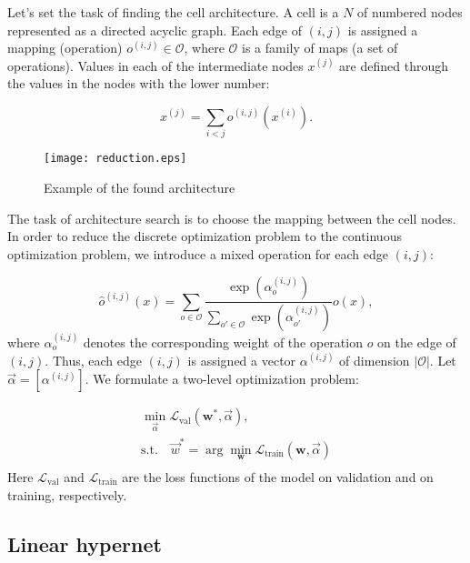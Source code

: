 \documentclass[runningheads]{llncs}
\begin{document}
Let's set the task of finding the cell architecture.
A cell is a $N$ of numbered nodes represented as a directed acyclic graph. Each edge of $(i, j)$ is assigned a mapping (operation) $o^{(i, j)} \in \mathcal{O}$, where $\mathcal{O}$ is a family of maps (a set of operations). Values in each of the intermediate nodes $x^{(j)}$ are defined through the values in the nodes with the lower number:

 \begin{equation}
 x^{(j)} = \sum_{i < j}o^{(i, j)}(x^{(i)}).
 \end{equation}
 
 \begin{figure}
 \centering
 \texttt{[image: reduction.eps]}
 \caption{Example of the found architecture}
 \end{figure}

The task of architecture search is to choose the mapping between the cell nodes. In order to reduce the discrete optimization problem to the continuous optimization problem, we introduce a mixed operation for each edge $(i, j)$:

\begin{equation}
\hat{o}^{(i, j)}(x) = \sum_{o\in \mathcal{O}} \frac{\exp(\alpha_o^{(i, j)})}{\sum_{o'\in\mathcal{O}} \exp(\alpha_{o'}^{(i, j)})}o(x),
\end{equation}
where $\alpha_o^{(i, j)}$ denotes the corresponding weight of the operation $o$ on the edge of $(i, j)$. Thus, each edge $(i, j)$ is assigned a vector $\alpha^{(i, j)}$ of dimension $|\mathcal{O}|$. Let
$\vec{\alpha} = [\alpha^{(i, j)}]$. We formulate a two-level optimization problem:

\begin{equation}
\label{optim}
\begin{array}{rrclcl}
\displaystyle \min_{\vec{\alpha}}\mathcal{L}_\mathrm{val}(\mathbf{w}^*, \vec{\alpha}),\\
\textrm{s.t.}\displaystyle \quad \vec{w}^* = \arg\min_{\mathbf{w}}\mathcal{L}_\mathrm{train}(\mathbf{w}, \vec{\alpha})\\
\end{array}
\end{equation}
Here $\mathcal{L}_\mathrm{val}$ and $\mathcal{L}_\mathrm{train}$ are the loss functions of the model on validation and on training, respectively.

\subsection{Linear hypernet}
\end{document}
